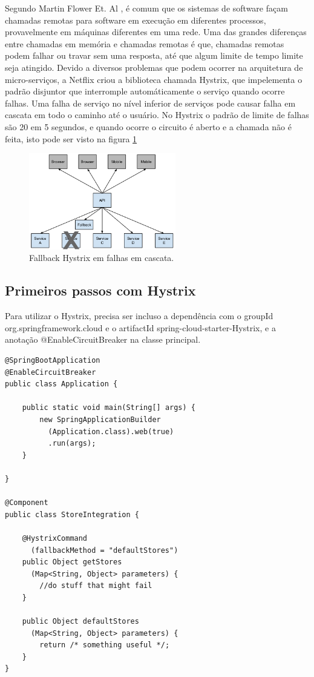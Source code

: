 \documentclass[journal]{IEEEtran}
\begin{document}
Segundo Martin Flower Et. Al \cite{martinfowleretal}, é comum que os sistemas de software façam chamadas remotas para software em execução em diferentes processos, provavelmente em máquinas diferentes em uma rede. Uma das grandes diferenças entre chamadas em memória e chamadas remotas é que, chamadas remotas podem falhar ou travar sem uma resposta, até que algum limite de tempo limite seja atingido. Devido a diversos problemas que podem ocorrer na arquitetura de micro-serviços, a Netflix criou a biblioteca chamada Hystrix, que impelementa o padrão disjuntor que interromple automáticamente o serviço quando ocorre falhas. Uma falha de serviço no nível inferior de serviços pode causar falha em cascata em todo o caminho até o usuário. No Hystrix o padrão de limite de falhas são 20 em 5 segundos, e quando ocorre o circuito é aberto e a chamada não é feita, isto pode ser visto na figura \ref{fig:figura7}

\begin{figure}[h]
\centering
\includegraphics[height=4.2cm]{figura7}
\caption{Fallback Hystrix em falhas em cascata.}
\label{fig:figura7}
\end{figure}

\subsection{Primeiros passos com Hystrix}

Para utilizar o Hystrix, precisa ser incluso a dependência com o groupId org.springframework.cloud e o artifactId spring-cloud-starter-Hystrix, e a anotação @EnableCircuitBreaker na classe principal.

\begin{verbatim}
@SpringBootApplication
@EnableCircuitBreaker
public class Application {

    public static void main(String[] args) {
        new SpringApplicationBuilder
          (Application.class).web(true)
          .run(args);
    }

}

@Component
public class StoreIntegration {

    @HystrixCommand
      (fallbackMethod = "defaultStores")
    public Object getStores
      (Map<String, Object> parameters) {
        //do stuff that might fail
    }

    public Object defaultStores
      (Map<String, Object> parameters) {
        return /* something useful */;
    }
}
\end{verbatim}
\end{document}
